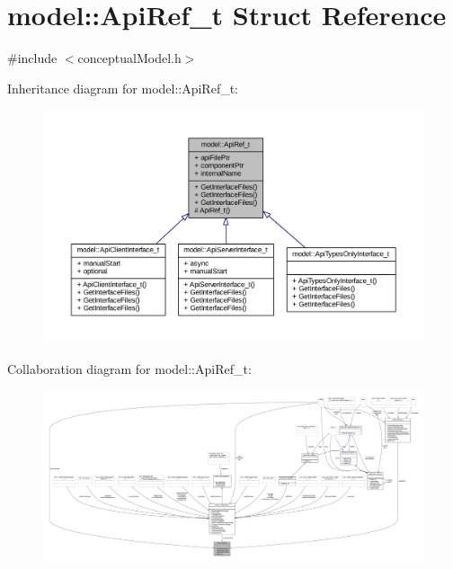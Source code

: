 \hypertarget{structmodel_1_1_api_ref__t}{}\section{model\+:\+:Api\+Ref\+\_\+t Struct Reference}
\label{structmodel_1_1_api_ref__t}


{\ttfamily \#include $<$conceptual\+Model.\+h$>$}



Inheritance diagram for model\+:\+:Api\+Ref\+\_\+t\+:
\nopagebreak
\begin{figure}[H]
\begin{center}
\leavevmode
\includegraphics[width=350pt]{structmodel_1_1_api_ref__t__inherit__graph}
\end{center}
\end{figure}


Collaboration diagram for model\+:\+:Api\+Ref\+\_\+t\+:
\nopagebreak
\begin{figure}[H]
\begin{center}
\leavevmode
\includegraphics[width=350pt]{structmodel_1_1_api_ref__t__coll__graph}
\end{center}
\end{figure}
